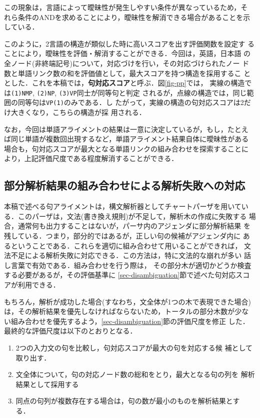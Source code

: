 この現象は，言語によって曖昧性が発生しやすい条件が異なっているため，そ
れら条件のANDを求めることにより，曖昧性を解消できる場合があることを示
している．

このように，2言語の構造が類似した時に高いスコアを出す評価関数を設定す
ることにより，曖昧性を評価・解消することができる．今回は，英語，日本語
の全ノード(非終端記号)について，対応づけを行い，その対応づけられたノー
ド数と単語リンク数の和を評価値として，最大スコアを持つ構造を採用するこ
ととした．これを本稿では，{\bf 句対応スコア}と呼ぶ．図\ref{fig-pp}では，
実線の構造では{\tt (1)NMP}, {\tt (2)NP}, {\tt (3)VP}同士が同等句と判定
されるが，点線の構造では，同じ範囲の同等句は{\tt VP(1)}のみである．し
たがって，実線の構造の句対応スコアは2だけ大きくなり，こちらの構造が採
用される．

なお，今回は単語アライメントの結果は一意に決定しているが，もし，たとえ
ば同じ単語が複数回出現するなど，単語アライメント結果自体に曖昧性がある
場合も，句対応スコアが最大となる単語リンクの組み合わせを探索することに
より，上記評価尺度である程度解消することができる．

\subsection{部分解析結果の組み合わせによる解析失敗への対応}
\label{sec-partial}

本稿で述べる句アライメントは，構文解析器としてチャートパーザを用いてい
る．このパーザは，文法(書き換え規則)が不足して，解析木の作成に失敗する
場合，通常何も出力することはないが，パーサ内のアジェンダに部分解析結果
を残している．つまり，部分的ではあるが，正しい句の候補がアジェンダ内に
あるということである．これらを適切に組み合わせて用いることができれば，
文法不足による解析失敗に対応できる．この方法は，特に文法的な崩れが多い
話し言葉で有効である\cite{Takezawa:Parsing1996j}．組み合わせを行う際は，
その部分木が適切かどうか検査する必要があるが，その評価基準に
\ref{sec-disambiguation}節で述べた句対応スコアが利用できる．

もちろん，解析が成功した場合(すなわち，文全体が1つの木で表現できた場合)
は，その解析結果を優先しなければならないため，トータルの部分木数が少な
い組み合わせを優先するよう，\ref{sec-disambiguation}節の評価尺度を修正
した．最終的な評価尺度は以下のとおりとなる．

\begin{enumerate}
\item 2つの入力文の句を比較し，句対応スコアが最大の句を対応する候
補として取り出す．
\item 文全体について，句の対応ノード数の総和をとり，最大となる句の列を
解析結果として採用する
\item 同点の句列が複数存在する場合は，句の数が最小のものを解析結果とす
る．
\end{enumerate}

